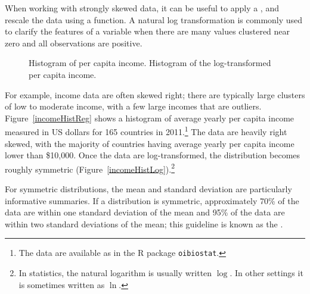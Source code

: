 When working with strongly skewed data, it can be useful to apply a , and rescale the data using a function. A natural log transformation is commonly used to clarify the features of a variable when there are many values clustered near zero and all observations are positive.

\begin{figure}[ht]
	\centering
	\caption{ Histogram of per capita income.  Histogram of the log-transformed per capita income.}
	\label{incomeHistTransform}
\end{figure}

For example, income data are often skewed right; there are typically large clusters of low to moderate income, with a few large incomes that are outliers. Figure~\ref{incomeHistReg} shows a histogram of average yearly per capita income measured in US dollars for 165 countries in 2011.\footnote{The data are available as  in the \textsf{R} package \texttt{oibiostat}.} The data are heavily right skewed, with the majority of countries having average yearly per capita income lower than \$10,000. Once the data are log-transformed, the distribution becomes roughly symmetric (Figure~\ref{incomeHistLog}).\footnote{In statistics, the natural logarithm is usually written $\log$. In other settings it is sometimes written as  $\ln$.} 

For symmetric distributions, the mean and standard deviation are particularly informative summaries. If a distribution is symmetric, approximately 70\% of the data are within one standard deviation of the mean and 95\% of the data are within two standard deviations of the mean; this guideline is known as the .

